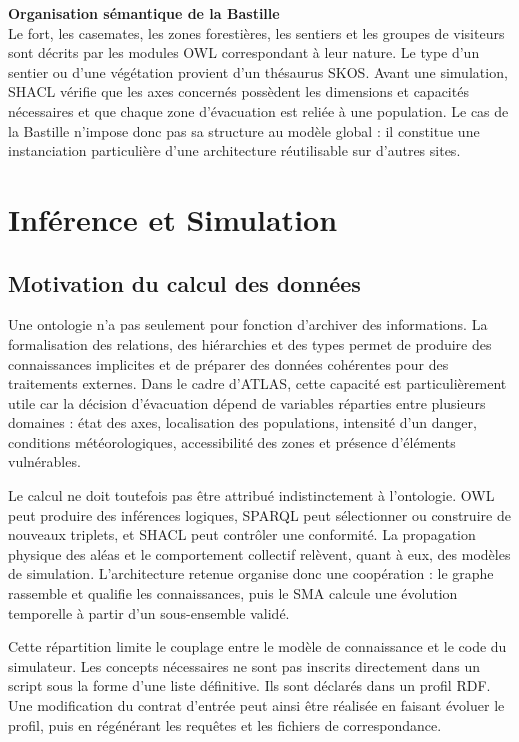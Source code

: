 \documentclass{article}
\begin{document}
\begin{filrouge}
\textbf{Organisation sémantique de la Bastille} \\
Le fort, les casemates, les zones forestières, les sentiers et les groupes de visiteurs sont décrits par les modules OWL correspondant à leur nature. Le type d'un sentier ou d'une végétation provient d'un thésaurus SKOS. Avant une simulation, SHACL vérifie que les axes concernés possèdent les dimensions et capacités nécessaires et que chaque zone d'évacuation est reliée à une population. Le cas de la Bastille n'impose donc pas sa structure au modèle global : il constitue une instanciation particulière d'une architecture réutilisable sur d'autres sites.
\end{filrouge}

\clearpage
\section{Inférence et Simulation}
\subsection{Motivation du calcul des données}

Une ontologie n'a pas seulement pour fonction d'archiver des informations. La formalisation des relations, des hiérarchies et des types permet de produire des connaissances implicites et de préparer des données cohérentes pour des traitements externes. Dans le cadre d'ATLAS, cette capacité est particulièrement utile car la décision d'évacuation dépend de variables réparties entre plusieurs domaines : état des axes, localisation des populations, intensité d'un danger, conditions météorologiques, accessibilité des zones et présence d'éléments vulnérables.

Le calcul ne doit toutefois pas être attribué indistinctement à l'ontologie. OWL peut produire des inférences logiques, SPARQL peut sélectionner ou construire de nouveaux triplets, et SHACL peut contrôler une conformité. La propagation physique des aléas et le comportement collectif relèvent, quant à eux, des modèles de simulation. L'architecture retenue organise donc une coopération : le graphe rassemble et qualifie les connaissances, puis le SMA calcule une évolution temporelle à partir d'un sous-ensemble validé.

Cette répartition limite le couplage entre le modèle de connaissance et le code du simulateur. Les concepts nécessaires ne sont pas inscrits directement dans un script sous la forme d'une liste définitive. Ils sont déclarés dans un profil RDF. Une modification du contrat d'entrée peut ainsi être réalisée en faisant évoluer le profil, puis en régénérant les requêtes et les fichiers de correspondance.
\end{document}
